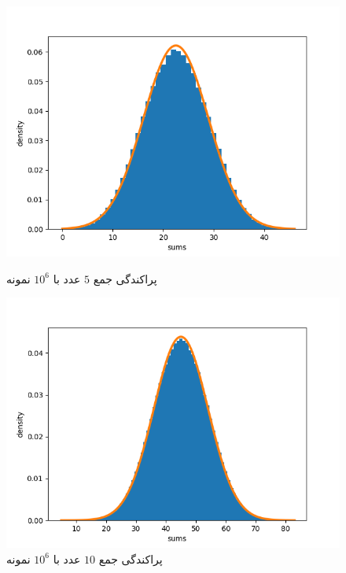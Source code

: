 \documentclass[11pt, a4paper]{article}
\begin{document}
\begin{figure}[h!]
	\centering
  \begin{minipage}[b]{0.48\textwidth}
    \includegraphics[width=\textwidth]{q3_5_1000000.png}
    \caption{پراکندگی‌ جمع $5$ عدد با $10^6$ نمونه}
    \label{fig:q3_5}
  \end{minipage}
  \hfill
  \begin{minipage}[b]{0.48\textwidth}
    \includegraphics[width=\textwidth]{q3_10_1000000.png}
    \caption{پراکندگی‌ جمع $10$ عدد با $10^6$ نمونه}
    \label{fig:q3_10}
  \end{minipage}
  \begin{minipage}[b]{0.48\textwidth}

\end{minipage}
\end{figure}
\end{document}
